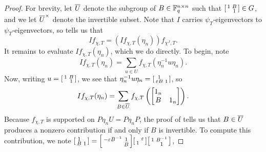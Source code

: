 \begin{proof}
	For brevity, let $\overline{U}$ denote the subgroup of $B\in \mathbb F_q^{n\times n}$ such that $\begin{bsmallmatrix}
		1 & B \\ & 1
	\end{bsmallmatrix}\in G$, and we let $\overline{U}^\times$ denote the invertible subset. Note that $I$ carries $\psi_T$-eigenvectors to $\psi_T$-eigenvectors, so  tells us that
	\[If_{\chi,T}=\left(If_{\chi,T}(\eta_n)\right)f_{\chi^J,T}.\]
	It remains to evaluate $If_{\chi,T}(\eta_n)$, which we do directly. To begin, note
	\[If_{\chi,T}(\eta_n)=\sum_{u\in U}f_{\chi,T}\left(\eta_n^{-1}u\eta_n\right).\]
	Now, writing $u=\begin{bsmallmatrix}
		1 & B \\ & 1
	\end{bsmallmatrix}$, we see that $\eta_n^{-1}u\eta_n=\begin{bsmallmatrix}
		1 \\ \varepsilon B & 1
	\end{bsmallmatrix}$, so
	\[If_{\chi,T}(\eta_n)=\sum_{B\in\overline{U}}f_{\chi,T}\left(\begin{bmatrix}
		1_n \\ B & 1_n
	\end{bmatrix}\right).\]
	Because $f_{\chi,T}$ is supported on $P\eta_nU=P\eta_nP$, the proof of  tells us that $B\in\overline{U}$ produces a nonzero contribution if and only if $B$ is invertible. To compute this contribution, we note $\begin{bsmallmatrix}
	    1 \\ B & 1
	\end{bsmallmatrix}=\begin{bsmallmatrix}
	    -\varepsilon B^{-1} & 1 \\ & B
	\end{bsmallmatrix}\begin{bsmallmatrix}
	    & \varepsilon \\ 1
	\end{bsmallmatrix}\begin{bsmallmatrix}
	    1 & B^{-1} \\ & 1
	\end{bsmallmatrix}$,

\end{proof}
